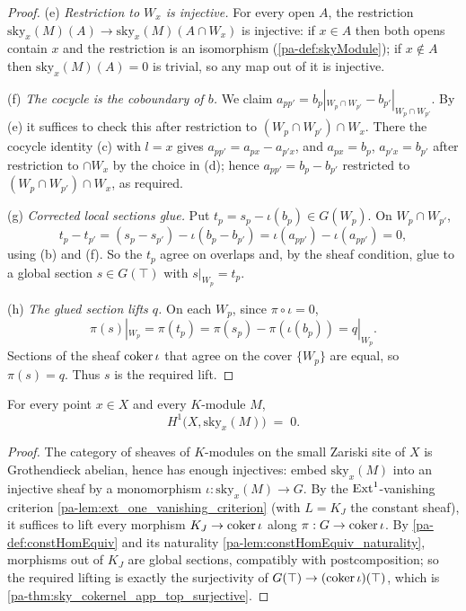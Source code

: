 \begin{proof}
  (e) \emph{Restriction to \(W_x\) is injective.} For every open \(A\), the restriction
  \(\mathrm{sky}_x(M)(A) \to \mathrm{sky}_x(M)(A \cap W_x)\) is injective: if \(x \in A\) then
  both opens contain \(x\) and the restriction is an isomorphism (\ref{pa-def:skyModule}); if
  \(x \notin A\) then \(\mathrm{sky}_x(M)(A) = 0\) is trivial, so any map out of it is injective.

  (f) \emph{The cocycle is the coboundary of \(b\).} We claim
  \(a_{pp'} = b_p|_{W_p \cap W_{p'}} - b_{p'}|_{W_p \cap W_{p'}}\). By (e) it suffices to check
  this after restriction to \((W_p \cap W_{p'}) \cap W_x\). There the cocycle identity (c) with
  \(l = x\) gives \(a_{pp'} = a_{px} - a_{p'x}\), and \(a_{px} = b_p\), \(a_{p'x} = b_{p'}\)
  after restriction to \(\cap W_x\) by the choice in (d); hence
  \(a_{pp'} = b_p - b_{p'}\) restricted to \((W_p \cap W_{p'}) \cap W_x\), as required.

  (g) \emph{Corrected local sections glue.} Put \(t_p = s_p - \iota(b_p) \in G(W_p)\). On
  \(W_p \cap W_{p'}\),
  \[
    t_p - t_{p'} = (s_p - s_{p'}) - \iota(b_p - b_{p'}) = \iota(a_{pp'}) - \iota(a_{pp'}) = 0 ,
  \]
  using (b) and (f). So the \(t_p\) agree on overlaps and, by the sheaf condition, glue to a
  global section \(s \in G(\top)\) with \(s|_{W_p} = t_p\).

  (h) \emph{The glued section lifts \(q\).} On each \(W_p\), since \(\pi \circ \iota = 0\),
  \[
    \pi(s)|_{W_p} = \pi(t_p) = \pi(s_p) - \pi(\iota(b_p)) = q|_{W_p} .
  \]
  Sections of the sheaf \(\operatorname{coker} \iota\) that agree on the cover \(\{W_p\}\) are equal, so
  \(\pi(s) = q\). Thus \(s\) is the required lift.
\end{proof}

\begin{theorem}
  \label{pa-thm:skyModule_h1_vanishing}
  \leanok

  For every point \(x \in X\) and every \(K\)-module \(M\),
  \[
    H^1\bigl(X, \mathrm{sky}_x(M)\bigr) \;=\; 0 .
  \]
\end{theorem}
\begin{proof}
  \leanok
  The category of sheaves of \(K\)-modules on the small Zariski site of \(X\) is Grothendieck
  abelian, hence has enough injectives: embed \(\mathrm{sky}_x(M)\) into an injective sheaf by a
  monomorphism \(\iota : \mathrm{sky}_x(M) \to G\). By the \(\operatorname{Ext}^1\)-vanishing criterion
  \ref{pa-lem:ext_one_vanishing_criterion} (with \(L = K_J\) the constant sheaf), it suffices to
  lift every morphism \(K_J \to \operatorname{coker} \iota\) along \(\pi : G \to \operatorname{coker} \iota\). By
  \ref{pa-def:constHomEquiv} and its naturality \ref{pa-lem:constHomEquiv_naturality}, morphisms out
  of \(K_J\) are global sections, compatibly with postcomposition; so the required lifting is
  exactly the surjectivity of \(G(\top) \to (\operatorname{coker} \iota)(\top)\), which is
  \ref{pa-thm:sky_cokernel_app_top_surjective}.
\end{proof}

